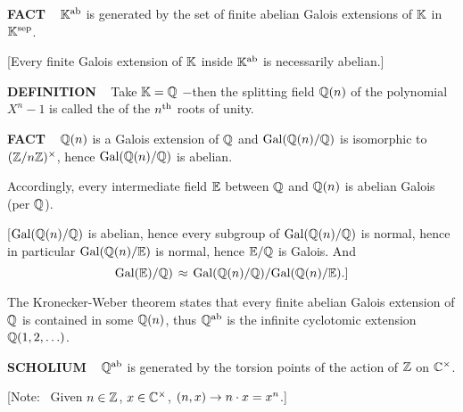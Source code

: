 \vspace{0.1cm}

\begin{x}{\small\bf FACT} \ %
$\mathbb{K}^{\text{ab}}$ is generated by the set of finite abelian Galois extensions of $\mathbb{K}$ in $\mathbb{K}^{\text{sep}}$.

\vspace{0.1cm}

[Every finite Galois extension of $\mathbb{K}$ inside $\mathbb{K}^{\text{ab}}$ is necessarily abelian.]
\end{x}

\vspace{0.1cm}

\begin{x}{\small\bf DEFINITION} \ %
Take $\mathbb{K} = \mathbb{Q}$ $-$then the splitting field $\mathbb{Q}(n)$ of the polynomial $X^n - 1$ is called the 
of the $n^{\text{th}}$ roots of unity.
\end{x}

\vspace{0.1cm}

\begin{x}{\small\bf FACT} \ %
$\mathbb{Q}(n)$ is a Galois extension of $\mathbb{Q}$ and $\text{Gal}(\mathbb{Q}(n)/\mathbb{Q})$ is isomorphic to 
$(\mathbb{Z}/n\mathbb{Z})^\times$, hence $\text{Gal}(\mathbb{Q}(n)/\mathbb{Q})$ is abelian.
\end{x}
\vspace{0.1cm}

Accordingly, every intermediate field $\mathbb{E}$ between $\mathbb{Q}$ and $\mathbb{Q}(n)$ is abelian Galois (per $\mathbb{Q}$).

\vspace{0.1cm}

[$\text{Gal}(\mathbb{Q}(n) / \mathbb{Q})$ is abelian, hence every subgroup of $\text{Gal}(\mathbb{Q}(n) / \mathbb{Q})$ is normal, hence in particular 
$\text{Gal}(\mathbb{Q}(n) / \mathbb{E})$ is normal, hence $\mathbb{E}/\mathbb{Q}$ is Galois.  And 
\[
\text{Gal}(\mathbb{E}) / \mathbb{Q}) \hspace{0.05cm} \approx \hspace{0.05cm} \text{Gal}(\mathbb{Q}(n) / \mathbb{Q}) / \text{Gal}(\mathbb{Q}(n) / \mathbb{E}).]
\]

\vspace{0.2cm}

The Kronecker-Weber theorem states that every finite abelian Galois extension of $\mathbb{Q}$ is contained in some $\mathbb{Q}(n)$, 
thus $\mathbb{Q}^{\text{ab}}$ is the infinite cyclotomic extension $\mathbb{Q}(1, 2, \ldots)$.

\vspace{0.2cm}

\begin{x}{\small\bf SCHOLIUM} \ %
$\mathbb{Q}^{\text{ab}}$ is generated by the torsion points of the action of $\mathbb{Z}$ on $\mathbb{C}^\times$.

\vspace{0.1cm}

[Note: \ Given $n \in \mathbb{Z}$, $x \in \mathbb{C}^\times$, $(n,x) \rightarrow n \cdot x = x^n$.]
\end{x}


